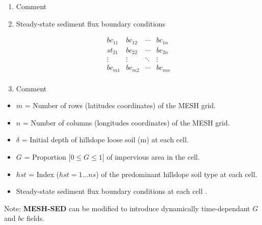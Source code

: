 \documentclass[12pt, letterpaper]{article}
\newcommand{\ms}{\textbf{MESH-SED} }
\newcounter{ResumeEnumerate}
\begin{document}
{\begin{enumerate}[label=Line \arabic*]
\begin{minipage}[t]{0.1\linewidth}
\begin{flushright}
$$\begin{matrix}
hst_{m1} & hst_{m2} & \cdots & hst_{mn}\\
\end{matrix}
$$
\end{flushright}
\end{minipage}
\item Comment
\item Steady-state sediment flux boundary conditions\\[-2.7em]
\begin{minipage}[t]{0.1\linewidth}
\begin{flushright}
$$
\begin{matrix} 
bc_{11} & bc_{12} & \cdots & bc_{1n} \\
st_{21} & bc_{22} & \cdots & bc_{2n} \\
\vdots & \vdots & \ddots & \vdots \\
bc_{m1} & bc_{m2} & \cdots & bc_{mn}\\
\end{matrix}
$$
\end{flushright}
\end{minipage}
\item Comment
\end{enumerate}
\setcounter{ResumeEnumerate}{\value{enumi}}
}
{\scriptsize 
\begin{itemize}[label={}]
\item $m$ = Number of rows (latitudes coordinates) of the MESH grid.
\item $n$ = Number of columns (longitudes coordinates) of the MESH grid.
\item $\delta$ = Initial depth of hillslope loose soil (m) at each cell.
\item $G$ =  Proportion [$0\leq G \leq 1$] of impervious area in the cell.
\item $hst$ =  Index ($hst = 1 ... ns$) of the predominant hillslope soil type at each cell.
\item Steady-state sediment flux boundary conditions at each cell . 
\end{itemize}
Note: \ms can be modified to introduce dynamically time-dependant $G$ and $bc$ fields.
}
\end{document}
